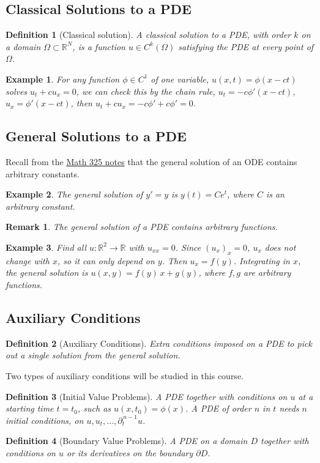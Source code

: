 \documentclass{article}
\newtheorem{definition}{Definition}
\newtheorem*{example}{Example}
\newtheorem{remark}{Remark}
\newcommand{\R}{\mathbb{R}}
\begin{document}
\subsection{Classical Solutions to a PDE}
\begin{definition}[Classical solution]
    A classical solution to a PDE, with order $k$ on a domain $\Omega \subset\R^N$, is a function $u \in C^k(\Omega)$ satisfying the PDE at every point of $\Omega$.
\end{definition}
\begin{example}
    For any function $\phi \in C^1$ of one variable, $u(x,t) = \phi(x-ct)$ solves $u_t+cu_x=0$, we can check this by the chain rule, $u_t = -c\phi'(x-ct)$, $u_x = \phi'(x-ct)$, then $u_t+cu_x = -c\phi'+c\phi' = 0$.
\end{example}

\subsection{General Solutions to a PDE}
Recall from the \href{https://github.com/williamr-yc7/stem-undergrad-notes/blob/86199275ed081fd521621a48faec61bef0cb1069/Winter\%202026/Math325.pdf}{Math 325 notes} that the general solution of an ODE contains arbitrary constants.
\begin{example}
    The general solution of $y' = y$ is $y(t) = Ce^t$, where $C$ is an arbitrary constant.
\end{example}
\begin{remark}
    The general solution of a PDE contains arbitrary functions.
\end{remark}
\begin{example}
    Find all $u : \R^2 \to \R$ with $u_{xx} = 0$. Since $(u_x)_x = 0$, $u_x$ does not change with $x$, so it can only depend on $y$. Then $u_x = f(y)$. Integrating in $x$, the general solution is $u(x,y) = f(y)\,x + g(y)$, where $f, g$ are arbitrary functions.
\end{example}

\subsection{Auxiliary Conditions}
\begin{definition}[Auxiliary Conditions]
    Extra conditions imposed on a PDE to pick out a single solution from the general solution.
\end{definition}
Two types of auxiliary conditions will be studied in this course.
\begin{definition}[Initial Value Problems]
    A PDE together with conditions on $u$ at a starting time $t = t_0$, such as $u(x,t_0) = \phi(x)$. A PDE of order $n$ in $t$ needs $n$ initial conditions, on $u, u_t, \dots, \partial_t^{\,n-1}u$.
\end{definition}
\begin{definition}[Boundary Value Problems]
    A PDE on a domain $D$ together with conditions on $u$ or its derivatives on the boundary $\partial D$.
\end{definition}
\end{document}
